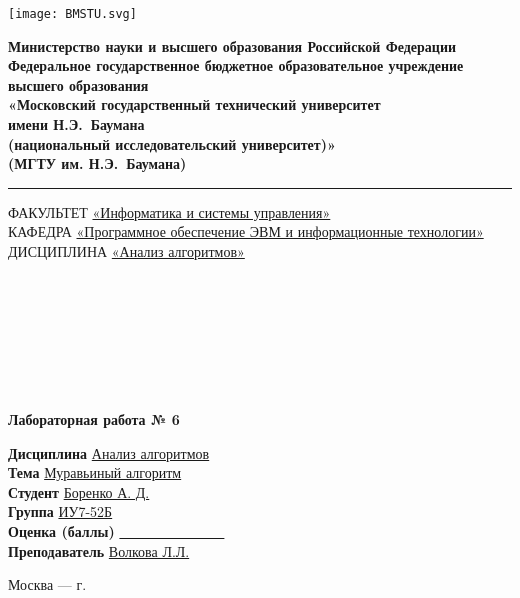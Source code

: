 
\begin{titlepage}
    


    \noindent \begin{minipage}{0.20\textwidth}
        \texttt{[image: BMSTU.svg]}
    \end{minipage}
    \noindent\begin{minipage}{0.8\textwidth}\centering \singlespacing\small
        \textbf{Министерство науки и высшего образования Российской Федерации}\\
        \textbf{Федеральное государственное бюджетное образовательное учреждение высшего образования}\\
        \textbf{«Московский государственный технический университет \\ имени Н.Э.~Баумана}\\
        \textbf{(национальный исследовательский университет)»}\\
        \textbf{(МГТУ им. Н.Э.~Баумана)}
    \end{minipage}
    
    \noindent\rule{18cm}{3pt}


    \begin{flushleft}
    \small{ФАКУЛЬТЕТ \underline{«Информатика и системы управления»}\\    
    КАФЕДРА \underline{«Программное обеспечение ЭВМ и информационные технологии»}}\\
    ДИСЦИПЛИНА \underline{«Анализ алгоритмов»}
    \end{flushleft}

    \
    
    \ 
    
    \ 
    
    \ 
    
    \begin{center}
        \Large\textbf{Лабораторная работа № 6}
    \end{center}


    \begin{flushleft}
        \textbf{Дисциплина} \underline{Анализ алгоритмов}\\
        \textbf{Тема} \underline{Муравьиный алгоритм}\\
        \textbf{Студент} \underline{Боренко А. Д.}\\
        \textbf{Группа} \underline{ИУ7-52Б}\\
        \textbf{Оценка (баллы)} \underline{~~~~~~~~~~~~~~~}\\
        \textbf{Преподаватель} \underline{Волкова Л.Л.}
    \end{flushleft}
    
        
    \begin{center}
        \vfill
        Москва --- \the\year г.
    \end{center}

\end{titlepage}

\setcounter{page}{2} 

\tableofcontents 